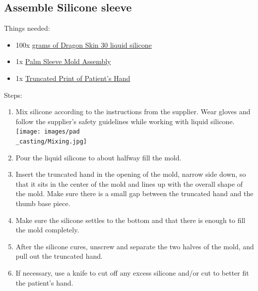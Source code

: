 \documentclass[11pt]{article}
\begin{document}
\subsection{Assemble Silicone sleeve}
Things needed:
\begin{itemize}
\item 100x \hyperlink{thing_g\_dragon\_skin\_30}{grams of Dragon Skin 30 liquid silicone}
\item 1x \hyperlink{thing_mold\_assembly}{Palm Sleeve Mold Assembly}
\item 1x \hyperlink{thing_truncated\_hand}{Truncated Print of Patient's Hand}
\end{itemize}
Steps:
\begin{enumerate}
\item Mix silicone according to the instructions from the supplier. Wear gloves and follow the supplier's safety guidelines while working with liquid silicone.\\ \texttt{[image: images/pad\\\_casting/Mixing.jpg]}
\item Pour the liquid silicone to about halfway fill the mold.
\item Insert the truncated hand in the opening of the mold, narrow side down, so that it sits in the center of the mold and lines up with the overall shape of the mold. Make sure there is a small gap between the truncated hand and the thumb base piece.
\item Make sure the silicone settles to the bottom and that there is enough to fill the mold completely.
\item After the silicone cures, unscrew and separate the two halves of the mold, and pull out the truncated hand.
\item If necessary, use a knife to cut off any excess silicone and/or cut to better fit the patient's hand.
\end{enumerate}
\end{document}
